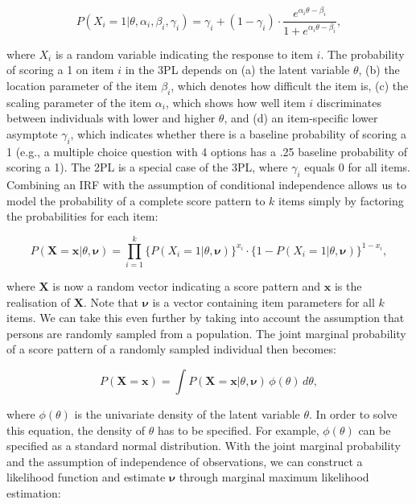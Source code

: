 \documentclass[Royal,sageapa,times,doublespace]{sagej}
\begin{document}
\begin{equation}
P(X_i = 1 | \theta, \alpha_{i}, \beta_{i}, \gamma_{i}) = \gamma_{i} + (1 - \gamma_{i}) \cdot 
\frac{e^{\alpha_{i}\theta - \beta_{i}}}{1 + e^{\alpha_{i}\theta - \beta_{i}}},
\end{equation}

where $X_i$ is a random variable indicating the response to item $i$. The probability of scoring a 1 on item $i$ in the 3PL depends on (a) the latent variable $\theta$, (b) the location parameter of the item $\beta_{i}$, which denotes how difficult the item is, (c) the scaling parameter of the item $\alpha_{i}$, which shows how well item $i$ discriminates between individuals with lower and higher $\theta$, and (d) an item-specific lower asymptote $\gamma_{i}$, which indicates whether there is a baseline probability of scoring a 1 (e.g., a multiple choice question with 4 options has a .25 baseline probability of scoring a 1). The 2PL is a special case of the 3PL, where $\gamma_{i}$ equals 0 for all items. \\
\indent Combining an IRF with the assumption of conditional independence allows us to model the probability of a complete score pattern to $k$ items simply by factoring the probabilities for each item:

\begin{equation}
P(\boldsymbol{X} = \boldsymbol{x} | \theta, \boldsymbol{\nu}) = \prod_{i=1}^{k} \{P(X_i = 1 | \theta, \boldsymbol{\nu})\}^{x_i} \cdot  \{1 - P(X_i = 1 | \theta, \boldsymbol{\nu}) \}^{1 - x_i},
\end{equation}

where $\boldsymbol{X}$ is now a random vector indicating a score pattern and $\boldsymbol{x}$ is the realisation of $\boldsymbol{X}$. Note that $\boldsymbol{\nu}$ is a vector containing item parameters for all $k$ items. We can take this even further by taking into account the assumption that persons are randomly sampled from a population. The joint marginal probability of a score pattern of a randomly sampled individual then becomes:

\begin{equation}
P(\boldsymbol{X} = \boldsymbol{x}) = \int P(\boldsymbol{X} = \boldsymbol{x} | \theta, \boldsymbol{\nu}) \,\phi(\theta)\,d\theta,
\end{equation}

where $\phi(\theta)$ is the univariate density of the latent variable $\theta$. In order to solve this equation, the density of $\theta$ has to be specified. For example, $\phi(\theta)$ can be specified as a standard normal distribution. With the joint marginal probability and the assumption of independence of observations, we can construct a likelihood function and estimate $\boldsymbol{\nu}$ through marginal maximum likelihood estimation:
\end{document}
